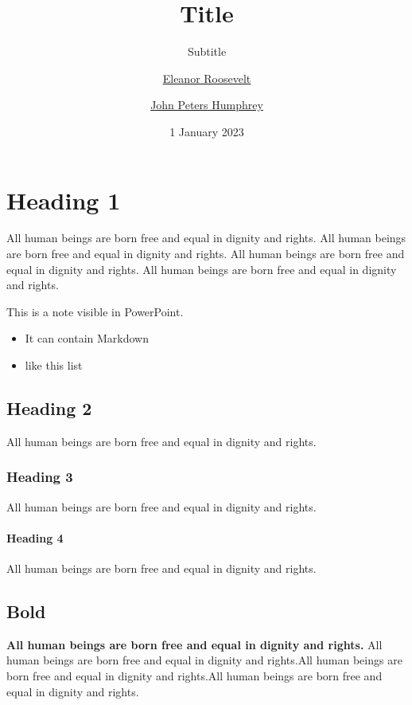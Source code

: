 \documentclass[
]{beamer}
\title{Title}
\subtitle{Subtitle}
\author{\href{eleanor.eoosevelt@domain.com}{Eleanor
Roosevelt} \and \href{jph@domain.com}{John Peters Humphrey}}
\date{1 January 2023}
\providecommand{\tightlist}{%
  \setlength{\itemsep}{0pt}\setlength{\parskip}{0pt}}
\begin{document}
\maketitle

{
\setcounter{tocdepth}{3}
\tableofcontents
}
\hypertarget{heading-1}{%
\section{Heading 1}\label{heading-1}}

All human beings are born free and equal in dignity and rights. All
human beings are born free and equal in dignity and rights. All human
beings are born free and equal in dignity and rights. All human beings
are born free and equal in dignity and rights.

This is a note visible in PowerPoint.

\begin{itemize}
\tightlist
\item
  It can contain Markdown
\item
  like this list
\end{itemize}

\hypertarget{heading-2}{%
\subsection{Heading 2}\label{heading-2}}

All human beings are born free and equal in dignity and rights.

\hypertarget{heading-3}{%
\subsubsection{Heading 3}\label{heading-3}}

All human beings are born free and equal in dignity and rights.

\hypertarget{heading-4}{%
\paragraph{Heading 4}\label{heading-4}}

All human beings are born free and equal in dignity and rights.

\hypertarget{bold}{%
\subsection{Bold}\label{bold}}

\textbf{All human beings are born free and equal in dignity and rights.}
All human beings are born free and equal in dignity and rights.All human
beings are born free and equal in dignity and rights.All human beings
are born free and equal in dignity and rights.
\end{document}
